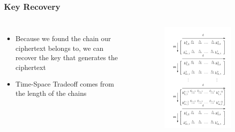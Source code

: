 \documentclass{beamer}
\begin{document}
\begin{frame}
\frametitle{Key Recovery}
\begin{columns}[c]
\begin{itemize}
\item Because we found the chain our ciphertext belongs to, we can recover the key that generates the ciphertext
\item Time-Space Tradeoff comes from the length of the chains
\end{itemize}

\begin{example}[On Board]

\end{example}
\begin{figure}
\includegraphics[width=0.9\linewidth]{figs/classic}
\end{figure}
\end{columns}
\end{frame}
\end{document}
